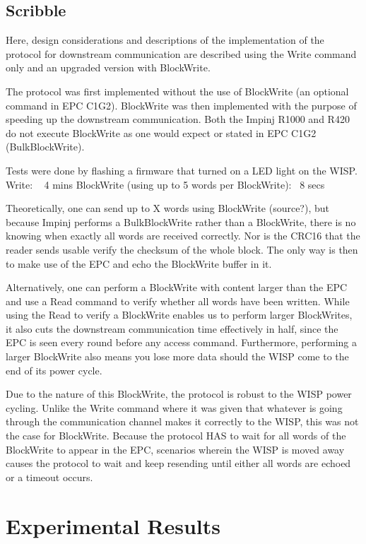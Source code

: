 \documentclass[11pt,twoside,a4paper,openright]{report}
\begin{document}
\section{Scribble}
Here, design considerations and descriptions of the implementation of the protocol for downstream communication are described using the Write command only and an upgraded version with BlockWrite.

The protocol was first implemented without the use of BlockWrite (an optional command in EPC C1G2).
BlockWrite was then implemented with the purpose of speeding up the downstream communication.
Both the Impinj R1000 and R420 do not execute BlockWrite as one would expect or stated in EPC C1G2 (BulkBlockWrite).

Tests were done by flashing a firmware that turned on a LED light on the WISP.
Write: ~ 4 mins
BlockWrite (using up to 5 words per BlockWrite): ~8 secs

Theoretically, one can send up to X words using BlockWrite (source?), but because Impinj performs a BulkBlockWrite rather than a BlockWrite, there is no knowing when exactly all words are received correctly.
Nor is the CRC16 that the reader sends usable verify the checksum of the whole block.
The only way is then to make use of the EPC and echo the BlockWrite buffer in it.

Alternatively, one can perform a BlockWrite with content larger than the EPC and use a Read command to verify whether all words have been written.
While using the Read to verify a BlockWrite enables us to perform larger BlockWrites, it also cuts the downstream communication time effectively in half, since the EPC is seen every round before any access command.
Furthermore, performing a larger BlockWrite also means you lose more data should the WISP come to the end of its power cycle.

Due to the nature of this BlockWrite, the protocol is robust to the WISP power cycling.
Unlike the Write command where it was given that whatever is going through the communication channel makes it correctly to the WISP, this was not the case for BlockWrite.
Because the protocol HAS to wait for all words of the BlockWrite to appear in the EPC, scenarios wherein the WISP is moved away causes the protocol to wait and keep resending until either all words are echoed or a timeout occurs.

\chapter{Experimental Results}
\label{results}
\end{document}
